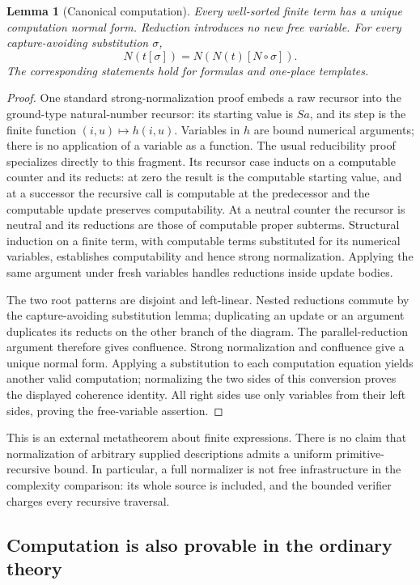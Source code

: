 \documentclass[11pt]{article}
\newtheorem{lemma}[theorem]{Lemma}
\theoremstyle{definition}\newtheorem{definition}[theorem]{Definition}
\theoremstyle{remark}\newtheorem{remark}[theorem]{Remark}
\begin{document}
\begin{lemma}[Canonical computation]
Every well-sorted finite term has a unique computation normal form.
Reduction introduces no new free variable. For every capture-avoiding
substitution $\sigma$,
\[
 N(t[\sigma])=N(N(t)[N\circ\sigma]).
\]
The corresponding statements hold for formulas and one-place templates.
\end{lemma}
\begin{proof}
One standard strong-normalization proof embeds a raw recursor into the
ground-type natural-number recursor: its starting value is $Sa$, and its
step is the finite function $(i,u)\mapsto h(i,u)$. Variables in $h$ are
bound numerical arguments; there is no application of a variable as a
function. The usual reducibility proof specializes directly to this
fragment. Its recursor case inducts on a computable counter and its
reducts: at zero the result is the computable starting value, and at a
successor the recursive call is computable at the predecessor and the
computable update preserves computability. At a neutral counter the
recursor is neutral and its reductions are those of computable proper
subterms. Structural induction on a finite term, with computable terms
substituted for its numerical variables, establishes computability and
hence strong normalization. Applying the same argument under fresh
variables handles reductions inside update bodies.

The two root patterns are disjoint and left-linear. Nested reductions
commute by the capture-avoiding substitution lemma; duplicating an update
or an argument duplicates its reducts on the other branch of the diagram.
The parallel-reduction argument therefore gives confluence. Strong
normalization and confluence give a unique normal form. Applying a
substitution to each computation equation yields another valid
computation; normalizing the two sides of this conversion proves the
displayed coherence identity. All right sides use only variables from
their left sides, proving the free-variable assertion.
\end{proof}

This is an external metatheorem about finite expressions. There is no
claim that normalization of arbitrary supplied descriptions admits a
uniform primitive-recursive bound. In particular, a full normalizer is
not free infrastructure in the complexity comparison: its whole source
is included, and the bounded verifier charges every recursive traversal.

\subsection{Computation is also provable in the ordinary theory}
\end{document}
